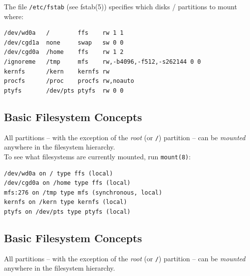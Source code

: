 \documentclass[xga]{xdvislides}
\begin{document}
The file \verb+/etc/fstab+ (see fstab(5)) specifies which disks / partitions
to mount where:
\\
\begin{verbatim}
/dev/wd0a   /        ffs    rw 1 1
/dev/cgd1a  none     swap   sw 0 0
/dev/cgd0a  /home    ffs    rw 1 2
/ignoreme   /tmp     mfs    rw,-b4096,-f512,-s262144 0 0
kernfs      /kern    kernfs rw
procfs      /proc    procfs rw,noauto
ptyfs       /dev/pts ptyfs  rw 0 0
\end{verbatim}
\Normalsize

\subsection{Basic Filesystem Concepts}
All partitions -- with the exception of the {\em root} (or \verb+/+) partition
-- can be {\em mounted} anywhere in the filesystem hierarchy.
\\

To see what filesystems are currently mounted, run \verb+mount(8)+:
\\

\begin{verbatim}
/dev/wd0a on / type ffs (local)
/dev/cgd0a on /home type ffs (local)
mfs:276 on /tmp type mfs (synchronous, local)
kernfs on /kern type kernfs (local)
ptyfs on /dev/pts type ptyfs (local)
\end{verbatim}


\subsection{Basic Filesystem Concepts}
All partitions -- with the exception of the {\em root} (or \verb+/+) partition
-- can be {\em mounted} anywhere in the filesystem hierarchy.
\\
\end{document}
